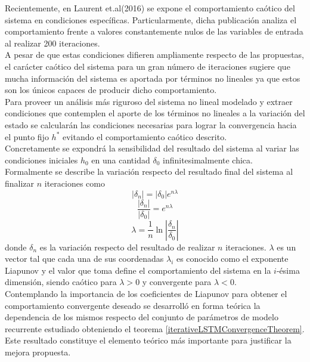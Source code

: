 \documentclass{article}
\begin{document}
	Recientemente, en Laurent et.al(2016)\cite{11Laurent} se expone el comportamiento caótico del sistema en condiciones específicas. Particularmente, dicha publicación analiza el comportamiento frente a valores constantemente nulos de las variables de entrada al realizar 200 iteraciones.\\
	A pesar de que estas condiciones difieren ampliamente respecto de las propuestas, el carácter caótico del sistema para un gran número de iteraciones sugiere que mucha información del sistema es aportada por términos no lineales ya que estos son los únicos capaces de producir dicho comportamiento\cite{21StrogatzBook}.\\
	
	Para proveer un análisis más riguroso del sistema no lineal modelado y extraer condiciones que contemplen el aporte de los términos no lineales a la variación del estado se calcularán las condiciones necesarias para lograr la convergencia hacia el punto fijo $h^*$ evitando el comportamiento caótico descrito.\\
	Concretamente se expondrá la sensibilidad del resultado del sistema al variar las condiciones iniciales $h_0$ en una cantidad $\delta_0$ infinitesimalmente chica.\\
	Formalmente se describe la variación respecto del resultado final del sistema al finalizar $n$ iteraciones como 
	\begin{equation*}
	|\delta_n| = |\delta_0| e ^{n\lambda} 
	\end{equation*}
	\begin{equation*}
	\dfrac{|\delta_n|}{|\delta_0|} =  e ^{n\lambda} 
	\end{equation*}
	\begin{equation*}
	\lambda = \dfrac{1}{n} \ln\left\lvert\dfrac{\delta_n}{\delta_0}\right\rvert
	\end{equation*}
	donde $\delta_n$ es la variación respecto del resultado de realizar $n$ iteraciones. $\lambda$ es un vector tal que cada una de sus coordenadas $\lambda_i$ es conocido como el exponente Liapunov y el valor que toma define el comportamiento del sistema en la $i$-ésima dimensión, siendo caótico para $\lambda > 0$ y convergente para $\lambda < 0$\cite{21StrogatzBook}.\\
	
	Contemplando la importancia de los coeficientes de Liapunov para obtener el comportamiento convergente deseado se desarrolló en forma teórica la dependencia de los mismos respecto del conjunto de parámetros de modelo recurrente estudiado obteniendo el teorema \ref{iterativeLSTMConvergenceTheorem}. Este resultado constituye el elemento teórico más importante para justificar la mejora propuesta.
	
\end{document}
